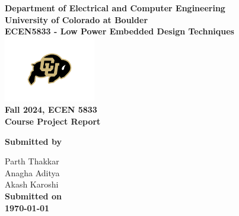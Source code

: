 \begin{titlepage}
\center %

\textbf{\large Department of Electrical and Computer Engineering}\\[0.5cm]
\textbf{\Large University of Colorado at Boulder}\\[1cm]
\textbf{\large ECEN5833 - Low Power Embedded Design Techniques}\\[2cm]
\includegraphics[width=0.3\textwidth]{figures/cu}\\[2cm] 

	
\textbf{\Huge Fall 2024, ECEN 5833 }\\[0.2cm]

\textbf{\Large Course Project Report}\\[2cm]
\vspace{1.5cm}



\vfill

\textbf{\large Submitted by}

{\large Parth Thakkar}\\
{\large Anagha Aditya}\\
{\large Akash Karoshi}\\[0.5cm]


\textbf{\large Submitted on}\\
\textbf{\Large \today} %


\vfill %

\end{titlepage}